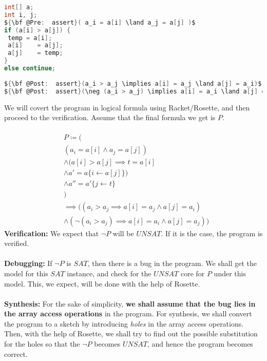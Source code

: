 \documentclass[a4paper, 12pt, notitlepage] {article}
\begin{document}
\begin{lstlisting}[language=C, mathescape=true]
int[] a;
int i, j;
${\bf @Pre:  assert}( a_i = a[i] \land a_j = a[j] )$
if (a[i] > a[j]) {
 temp = a[i];
 a[i]    = a[j];
 a[j]    = temp;
}
else continue;
	
${\bf @Post:  assert}(a_i > a_j \implies a[i] = a_j \land a[j] = a_i)$
${\bf @Post:  assert}(\neg (a_i > a_j) \implies a[i] = a_i \land a[j] = a_j)$
\end{lstlisting}
$ $\\
We will covert the program in logical formula using Racket/Rosette, and then proceed to the verification. Assume that the final formula we get is $P$.\\
\\
\begin{equation}
\begin{split}
  &P \coloneqq (\\
  &(a_i = a[i] \land a_j = a[j]) \\
&\land (a[i] > a[j] \implies t = a[i]\\
& \land a' = a\{i \leftarrow a[j]\})  \\
& \land a'' = a'\{j \leftarrow t\}\\
&) \\
&\implies ((a_i > a_j \implies a[i] = a_j \land a[j] = a_i)\\
&\land (\neg (a_i > a_j) \implies a[i] = a_i \land a[j] = a_j))
\end{split}
\end{equation}
{\bf Verification:} We expect that $\neg P$ will be $UNSAT$. If it is the case, the program is verified.
\\\\
{\bf Debugging:} If $\neg P$ is $SAT$, then there is a bug in the program. We shall get the model for this $SAT$ instance, and check for the $UNSAT$ core for $P$ under this model. This, we expect, will be done with the help of Rosette. \\
\\
{\bf Synthesis:} For the sake of simplicity, {\bf we shall assume that the bug lies in the array access operations} in the program. For synthesis, we shall convert the program to a sketch by introducing \emph{holes} in the array access operations. Then, with the help of Rosette, we shall try to find out the possible substitution for the holes so that the $\neg P$ becomes $UNSAT$, and hence the program becomes correct. \\
\\
\end{document}
